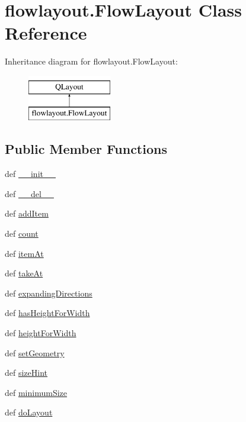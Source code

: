 \hypertarget{classflowlayout_1_1FlowLayout}{}\section{flowlayout.\+Flow\+Layout Class Reference}
\label{classflowlayout_1_1FlowLayout}
Inheritance diagram for flowlayout.\+Flow\+Layout\+:\begin{figure}[H]
\begin{center}
\leavevmode
\includegraphics[height=2.000000cm]{classflowlayout_1_1FlowLayout}
\end{center}
\end{figure}
\subsection*{Public Member Functions}
\begin{DoxyCompactItemize}
\item 
def \hyperlink{classflowlayout_1_1FlowLayout_a06f02a2d9e34c988581b3fef9924afec}{\+\_\+\+\_\+init\+\_\+\+\_\+}
\item 
def \hyperlink{classflowlayout_1_1FlowLayout_a7f8e5e9854ac7ec4677d8a1bf559b96e}{\+\_\+\+\_\+del\+\_\+\+\_\+}
\item 
def \hyperlink{classflowlayout_1_1FlowLayout_a395f2774719cf27c77870561b0065a8b}{add\+Item}
\item 
def \hyperlink{classflowlayout_1_1FlowLayout_a436a6a8ed2b70eba07703d393fe12cc6}{count}
\item 
def \hyperlink{classflowlayout_1_1FlowLayout_ab1e365be65dd8e6948d51cb66e90ea21}{item\+At}
\item 
def \hyperlink{classflowlayout_1_1FlowLayout_a190599c46a6f3a405448217f5f84c12c}{take\+At}
\item 
def \hyperlink{classflowlayout_1_1FlowLayout_a698c4d1702cd07097ee477f596fd089f}{expanding\+Directions}
\item 
def \hyperlink{classflowlayout_1_1FlowLayout_ad870a45bec3bb28ad36e84b429727d79}{has\+Height\+For\+Width}
\item 
def \hyperlink{classflowlayout_1_1FlowLayout_a4150afab85bf748acd7f44ebd626c9da}{height\+For\+Width}
\item 
def \hyperlink{classflowlayout_1_1FlowLayout_a75598ba271612a15c0f68b8d5d270654}{set\+Geometry}
\item 
def \hyperlink{classflowlayout_1_1FlowLayout_ab5a0fb6577432d7a0102c0657611470d}{size\+Hint}
\item 
def \hyperlink{classflowlayout_1_1FlowLayout_a26bad92784a56cc17bb6484479d7fd13}{minimum\+Size}
\item 
def \hyperlink{classflowlayout_1_1FlowLayout_a2a60f636be8c5124b3d98db23477af29}{do\+Layout}
\end{DoxyCompactItemize}
